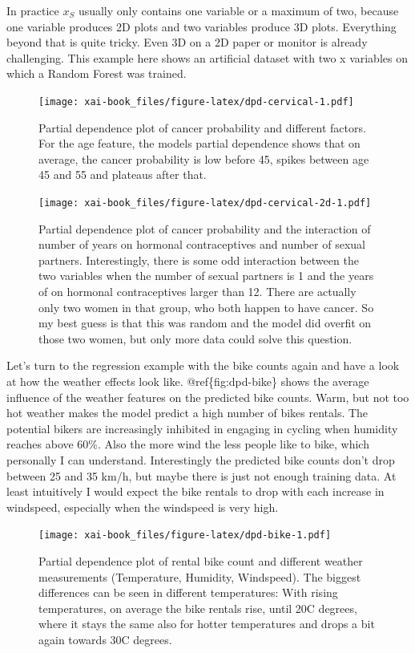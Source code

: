 \documentclass[12pt,]{krantz}
\theoremstyle{definition}
\theoremstyle{definition}
\theoremstyle{definition}
\theoremstyle{remark}
\begin{document}
In practice \(x_S\) usually only contains one variable or a maximum of
two, because one variable produces 2D plots and two variables produce 3D
plots. Everything beyond that is quite tricky. Even 3D on a 2D paper or
monitor is already challenging. This example here shows an artificial
dataset with two x variables on which a Random Forest was trained.

\begin{figure}
\centering
\texttt{[image: xai-book\_files/figure-latex/dpd-cervical-1.pdf]}
\caption{\label{fig:dpd-cervical}Partial dependence plot of cancer
probability and different factors. For the age feature, the models
partial dependence shows that on average, the cancer probability is low
before 45, spikes between age 45 and 55 and plateaus after that.}
\end{figure}

\begin{figure}
\centering
\texttt{[image: xai-book\_files/figure-latex/dpd-cervical-2d-1.pdf]}
\caption{\label{fig:dpd-cervical-2d}Partial dependence plot of cancer
probability and the interaction of number of years on hormonal
contraceptives and number of sexual partners. Interestingly, there is
some odd interaction between the two variables when the number of sexual
partners is 1 and the years of on hormonal contraceptives larger than
12. There are actually only two women in that group, who both happen to
have cancer. So my best guess is that this was random and the model did
overfit on those two women, but only more data could solve this
question.}
\end{figure}

Let's turn to the regression example with the bike counts again and have
a look at how the weather effects look like. @ref\{fig:dpd-bike\} shows
the average influence of the weather features on the predicted bike
counts. Warm, but not too hot weather makes the model predict a high
number of bikes rentals. The potential bikers are increasingly inhibited
in engaging in cycling when humidity reaches above 60\%. Also the more
wind the less people like to bike, which personally I can understand.
Interestingly the predicted bike counts don't drop between 25 and 35
km/h, but maybe there is just not enough training data. At least
intuitively I would expect the bike rentals to drop with each increase
in windspeed, especially when the windspeed is very high.

\begin{figure}
\centering
\texttt{[image: xai-book\_files/figure-latex/dpd-bike-1.pdf]}
\caption{\label{fig:dpd-bike}Partial dependence plot of rental bike count
and different weather measurements (Temperature, Humidity, Windspeed).
The biggest differences can be seen in different temperatures: With
rising temperatures, on average the bike rentals rise, until 20C
degrees, where it stays the same also for hotter temperatures and drops
a bit again towards 30C degrees.}
\end{figure}
\end{document}
